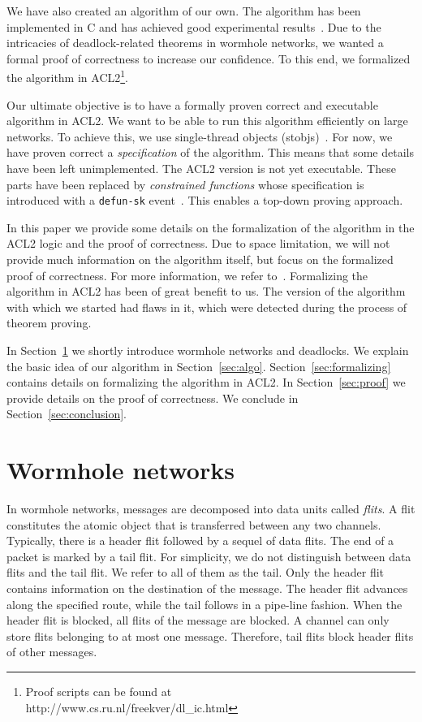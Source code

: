 \documentclass[submission,copyright]{eptcs}
\begin{document}
We have also created an algorithm of our own.
The algorithm has been implemented in C and has achieved good experimental results~\cite{verbeekschmaltz:nocs11}.
Due to the intricacies of deadlock-related theorems in wormhole networks, we wanted a formal proof of correctness to increase our confidence.
To this end, we formalized the algorithm in ACL2\footnote{Proof scripts can be found at \\ http://www.cs.ru.nl/freekver/dl\_ic.html}.

Our ultimate objective is to have a formally proven correct and executable algorithm in ACL2.
We want to be able to run this algorithm efficiently on large networks.
To achieve this, we use single-thread objects (stobjs)~\cite{boyer02}.
For now, we have proven correct a \emph{specification} of the algorithm. 
This means that some details have been left unimplemented.
The ACL2 version is not yet executable.
These parts have been replaced by \emph{constrained functions} whose specification is introduced with a {\tt defun-sk} event~\cite{kaufmann01}.
This enables a top-down proving approach.

In this paper we provide some details on the formalization of the algorithm in the ACL2 logic and the proof of correctness.
Due to space limitation, we will not provide much information on the algorithm itself, but focus on the formalized proof of correctness.
For more information, we refer to~\cite{verbeekschmaltz:nocs11}.
Formalizing the algorithm in ACL2 has been of great benefit to us.
The version of the algorithm with which we started had flaws in it, which were detected during the process of theorem proving.

In Section~\ref{sec:wormhole} we shortly introduce wormhole networks and deadlocks.
We explain the basic idea of our algorithm in Section~\ref{sec:algo}.
Section~\ref{sec:formalizing} contains details on formalizing the algorithm in ACL2.
In Section~\ref{sec:proof} we provide details on the proof of correctness.
We conclude in Section~\ref{sec:conclusion}.


\section{Wormhole networks}\label{sec:wormhole}

In wormhole networks, messages are decomposed into data units called \emph{flits}. A flit constitutes the atomic object 
that is transferred between any two channels. Typically, there is a header flit followed by 
a sequel of data flits. The end of a packet is marked by a tail flit. For simplicity, we do 
not distinguish between data flits and the tail flit. We refer to all of them as the tail. Only the header flit contains information on the destination of the message. 
The header flit advances along the specified route, while the tail follows in a pipe-line 
fashion. When the header flit is blocked, all flits of the message are blocked. A channel 
can only store flits belonging to at most one message. Therefore, tail flits block header 
flits of other messages. 
\end{document}

